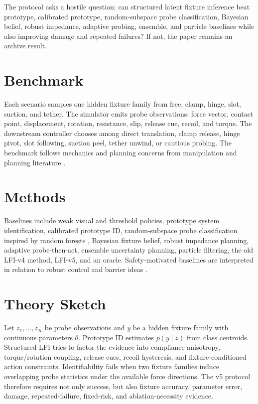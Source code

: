 \documentclass{article}
\begin{document}
The protocol asks a hostile question: can structured latent fixture inference beat prototype, calibrated prototype, random-subspace probe classification, Bayesian belief, robust impedance, adaptive probing, ensemble, and particle baselines while also improving damage and repeated failures?  If not, the paper remains an archive result.

\section{Benchmark}
Each scenario samples one hidden fixture family from free, clamp, hinge, slot, suction, and tether.  The simulator emits probe observations: force vector, contact point, displacement, rotation, resistance, slip, release cue, recoil, and torque.  The downstream controller chooses among direct translation, clamp release, hinge pivot, slot following, suction peel, tether unwind, or cautious probing.  The benchmark follows mechanics and planning concerns from manipulation and planning literature \citep{mason2001mechanics,lynch2017modern,lavalle2006planning}.

\section{Methods}
Baselines include weak visual and threshold policies, prototype system identification, calibrated prototype ID, random-subspace probe classification inspired by random forests \citep{breiman2001rf}, Bayesian fixture belief, robust impedance planning, adaptive probe-then-act, ensemble uncertainty planning, particle filtering, the old LFI-v4 method, LFI-v5, and an oracle.  Safety-motivated baselines are interpreted in relation to robust control and barrier ideas \citep{khatib1986potential,ames2017cbf,rawlings2017mpc}.

\section{Theory Sketch}
Let $z_1,\ldots,z_K$ be probe observations and $y$ be a hidden fixture family with continuous parameters $\theta$.  Prototype ID estimates $p(y\mid z)$ from class centroids.  Structured LFI tries to factor the evidence into compliance anisotropy, torque/rotation coupling, release cues, recoil hysteresis, and fixture-conditioned action constraints.  Identifiability fails when two fixture families induce overlapping probe statistics under the available force directions.  The v5 protocol therefore requires not only success, but also fixture accuracy, parameter error, damage, repeated-failure, fixed-risk, and ablation-necessity evidence.
\end{document}
